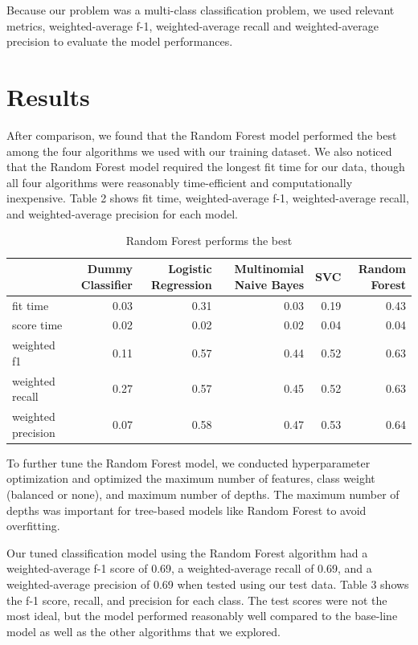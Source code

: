 \documentclass[
]{article}
\begin{document}
Because our problem was a multi-class classification problem, we used
relevant metrics, weighted-average f-1, weighted-average recall and
weighted-average precision to evaluate the model performances.

\hypertarget{results}{%
\section{Results}\label{results}}

After comparison, we found that the Random Forest model performed the
best among the four algorithms we used with our training dataset. We
also noticed that the Random Forest model required the longest fit time
for our data, though all four algorithms were reasonably time-efficient
and computationally inexpensive. Table 2 shows fit time,
weighted-average f-1, weighted-average recall, and weighted-average
precision for each model.

\begin{table}[!h]

\caption{\label{tab:model_compare}Random Forest performs the best}
\centering
\begin{tabular}[t]{l|r|r|r|r|r}
\hline
 & Dummy Classifier & Logistic Regression & Multinomial Naive Bayes & SVC & Random Forest\\
\hline
fit time & 0.03 & 0.31 & 0.03 & 0.19 & 0.43\\
\hline
score time & 0.02 & 0.02 & 0.02 & 0.04 & 0.04\\
\hline
weighted f1 & 0.11 & 0.57 & 0.44 & 0.52 & 0.63\\
\hline
weighted recall & 0.27 & 0.57 & 0.45 & 0.52 & 0.63\\
\hline
weighted precision & 0.07 & 0.58 & 0.47 & 0.53 & 0.64\\
\hline
\end{tabular}
\end{table}

To further tune the Random Forest model, we conducted hyperparameter
optimization and optimized the maximum number of features, class weight
(balanced or none), and maximum number of depths. The maximum number of
depths was important for tree-based models like Random Forest to avoid
overfitting.

Our tuned classification model using the Random Forest algorithm had a
weighted-average f-1 score of 0.69, a weighted-average recall of 0.69,
and a weighted-average precision of 0.69 when tested using our test
data. Table 3 shows the f-1 score, recall, and precision for each class.
The test scores were not the most ideal, but the model performed
reasonably well compared to the base-line model as well as the other
algorithms that we explored.
\end{document}
